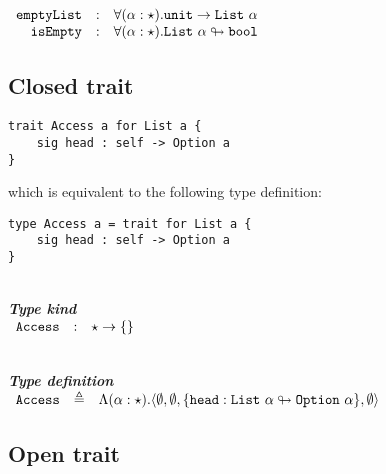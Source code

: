 \documentclass{article}[11pt]
\newcommand{\subsubsubsection}[1]
{
    ~\\
    {\bf {\em #1}} \\
}
\newcommand{\term}[1]{\verb~#1~}
\begin{document}
    \noindent
    \begin{math}
        \begin{array}{rclp{5cm}}
            \term{emptyList} & : & \forall(\alpha:\star).\term{unit} \rightarrow \term{List}~\alpha     \\
            \term{isEmpty}   & : & \forall(\alpha:\star).\term{List}~\alpha \looparrowright \term{bool}
        \end{array}
    \end{math}

    \subsection{Closed trait}\label{subsec:closed-trait}

    \begin{verbatim}
trait Access a for List a {
    sig head : self -> Option a
}
    \end{verbatim}

    which is equivalent to the following type definition:

    \begin{verbatim}
type Access a = trait for List a {
    sig head : self -> Option a
}
    \end{verbatim}

    \subsubsubsection{Type kind}

    \noindent
    \begin{math}
        \begin{array}{rclp{5cm}}
            \term{Access}  & : & \star \rightarrow  \{\}
        \end{array}
    \end{math}

    \subsubsubsection{Type definition}

    \noindent
    \begin{math}
        \begin{array}{rclp{5cm}}
            \term{Access} & \triangleq & \Lambda(\alpha:\star).\langle
            \emptyset,
            \emptyset,
            \{ \term{head} : \term{List}~\alpha \looparrowright \term{Option}~\alpha \},
            \emptyset
            \rangle
        \end{array}
    \end{math}

    \subsection{Open trait}
\end{document}
